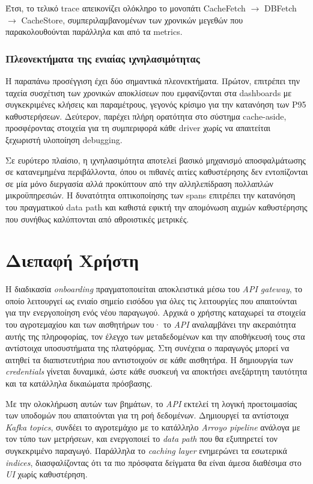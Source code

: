Έτσι, το τελικό trace απεικονίζει ολόκληρο το μονοπάτι CacheFetch $\rightarrow$
DBFetch $\rightarrow$ CacheStore, συμπεριλαμβανομένων των χρονικών μεγεθών που
παρακολουθούνται παράλληλα και από τα metrics.

\subsubsection{Πλεονεκτήματα της ενιαίας ιχνηλασιμότητας}

Η παραπάνω προσέγγιση έχει δύο σημαντικά πλεονεκτήματα. Πρώτον, επιτρέπει την
ταχεία συσχέτιση των χρονικών αποκλίσεων που εμφανίζονται στα dashboards με
συγκεκριμένες κλήσεις και παραμέτρους, γεγονός κρίσιμο για την κατανόηση των
P95 καθυστερήσεων. Δεύτερον, παρέχει πλήρη ορατότητα στο σύστημα cache-aside,
προσφέροντας στοιχεία για τη συμπεριφορά κάθε driver χωρίς να απαιτείται
ξεχωριστή υλοποίηση debugging.

Σε ευρύτερο πλαίσιο, η ιχνηλασιμότητα αποτελεί βασικό μηχανισμό αποσφαλμάτωσης
σε κατανεμημένα περιβάλλοντα, όπου οι πιθανές αιτίες καθυστέρησης δεν
εντοπίζονται σε μία μόνο διεργασία αλλά προκύπτουν από την αλληλεπίδραση
πολλαπλών μικροϋπηρεσιών. Η δυνατότητα οπτικοποίησης των spans επιτρέπει την
κατανόηση του πραγματικού data path και καθιστά εφικτή την απομόνωση αιχμών
καθυστέρησης που συνήθως καλύπτονται από αθροιστικές μετρικές.

\section{Διεπαφή Χρήστη}

Η διαδικασία \textit{onboarding} πραγματοποιείται αποκλειστικά μέσω του
\textit{API gateway}, το οποίο λειτουργεί ως ενιαίο σημείο εισόδου για όλες τις
λειτουργίες που απαιτούνται για την ενεργοποίηση ενός νέου παραγωγού. Αρχικά ο
χρήστης καταχωρεί τα στοιχεία του αγροτεμαχίου και των αισθητήρων του· το
\textit{API} αναλαμβάνει την ακεραιότητα αυτής της πληροφορίας, τον έλεγχο των
μεταδεδομένων και την αποθήκευσή τους στα αντίστοιχα υποσυστήματα της
πλατφόρμας. Στη συνέχεια ο παραγωγός μπορεί να αιτηθεί τα διαπιστευτήρια που
αντιστοιχούν σε κάθε αισθητήρα. Η δημιουργία των \textit{credentials} γίνεται
δυναμικά, ώστε κάθε συσκευή να αποκτήσει ανεξάρτητη ταυτότητα και τα κατάλληλα
δικαιώματα πρόσβασης.

Με την ολοκλήρωση αυτών των βημάτων, το \textit{API} εκτελεί τη λογική
προετοιμασίας των υποδομών που απαιτούνται για τη ροή δεδομένων. Δημιουργεί τα
αντίστοιχα \textit{Kafka topics}, συνδέει το αγροτεμάχιο με το κατάλληλο
\textit{Arroyo pipeline} ανάλογα με τον τύπο των μετρήσεων, και ενεργοποιεί το
\textit{data path} που θα εξυπηρετεί τον συγκεκριμένο παραγωγό. Παράλληλα το
\textit{caching layer} ενημερώνει τα εσωτερικά \textit{indices}, διασφαλίζοντας
ότι τα πιο πρόσφατα δείγματα θα είναι άμεσα διαθέσιμα στο \textit{UI} χωρίς
καθυστέρηση.

